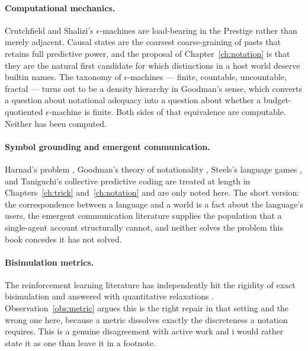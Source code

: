 \paragraph{Computational mechanics.}
Crutchfield and Shalizi's $\epsilon$-machines
\cite{shalizi2001} are load-bearing in the Prestige rather than
merely adjacent.
Causal states are the coarsest coarse-graining of pasts that
retains full predictive power, and the proposal of
Chapter~\ref{ch:notation} is that they are the natural first
candidate for which distinctions in a host world deserve builtin
names.
The taxonomy of $\epsilon$-machines --- finite, countable,
uncountable, fractal --- turns out to be a density hierarchy in
Goodman's sense, which converts a question about notational
adequacy into a question about whether a budget-quotiented
$\epsilon$-machine is finite.
Both sides of that equivalence are computable.
Neither has been computed.

\paragraph{Symbol grounding and emergent communication.}
Harnad's problem \cite{harnad1990}, Goodman's theory of
notationality \cite{goodman1968}, Steels's language games
\cite{steels2015}, and Taniguchi's collective predictive coding
\cite{taniguchi2024} are treated at length in
Chapters~\ref{ch:trick} and~\ref{ch:notation} and are only noted
here.
The short version: the correspondence between a language and a
world is a fact about the language's users, the emergent
communication literature supplies the population that a
single-agent account structurally cannot, and neither solves the
problem this book concedes it has not solved.

\paragraph{Bisimulation metrics.}
The reinforcement learning literature has independently hit the
rigidity of exact bisimulation and answered with quantitative
relaxations \cite{ferns2004,gelada2019,zhang2021,castro2021}.
Observation~\ref{obs:metric} argues this is the right repair in
that setting and the wrong one here, because a metric dissolves
exactly the discreteness a notation requires.
This is a genuine disagreement with active work and i would rather
state it as one than leave it in a footnote.

